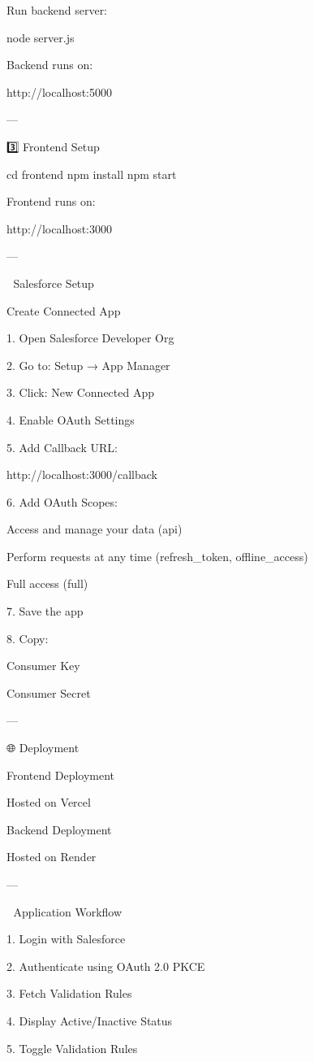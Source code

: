 Run backend server:

node server.js

Backend runs on:

http://localhost:5000


---

3️⃣ Frontend Setup

cd frontend
npm install
npm start

Frontend runs on:

http://localhost:3000


---

🔐 Salesforce Setup

Create Connected App

1. Open Salesforce Developer Org


2. Go to: Setup → App Manager


3. Click: New Connected App


4. Enable OAuth Settings


5. Add Callback URL:



http://localhost:3000/callback

6. Add OAuth Scopes:



Access and manage your data (api)

Perform requests at any time (refresh_token, offline_access)

Full access (full)


7. Save the app


8. Copy:



Consumer Key

Consumer Secret



---

🌐 Deployment

Frontend Deployment

Hosted on Vercel


Backend Deployment

Hosted on Render



---

📸 Application Workflow

1. Login with Salesforce


2. Authenticate using OAuth 2.0 PKCE


3. Fetch Validation Rules


4. Display Active/Inactive Status


5. Toggle Validation Rules


